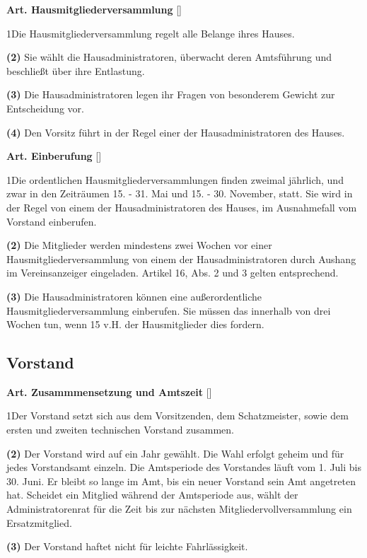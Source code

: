 \documentclass[12pt]{article}
\newcommand{\UAbschnitt}[1]{\subsection{#1}}
\newcommand{\Satz}[2]{

\begin{samepage}
{\bf (#1)} #2
\end{samepage}
}
\newenvironment{Artikel}[2]{
\bigskip \centerline{{\bf Art. #1} [#2]}
\nopagebreak
}{
}
\begin{document}
\begin{Artikel}{20}{Hausmitgliederversammlung}

\Satz{1}{Die Hausmitgliederversammlung regelt alle Belange ihres Hauses.}

\Satz{2}{Sie wählt die Hausadministratoren, überwacht deren Amtsführung und
beschließt über ihre Entlastung.}

\Satz{3}{Die Hausadministratoren legen ihr Fragen von besonderem Gewicht zur
Entscheidung vor.}

\Satz{4}{Den Vorsitz führt in der Regel einer der Hausadministratoren des
Hauses.}

\end{Artikel}

\begin{Artikel}{21}{Einberufung}

\Satz{1}{Die ordentlichen Hausmitgliederversammlungen finden zweimal jährlich,
und zwar in den Zeit\-räumen 15. - 31. Mai und 15. - 30. November, statt. Sie
wird in der Regel von einem der Hausadministratoren des Hauses, im Ausnahmefall
vom Vorstand einberufen.}

\Satz{2}{Die Mitglieder werden mindestens zwei Wochen vor einer
Hausmitgliederversammlung von einem der Hausadministratoren durch Aushang im
Vereinsanzeiger eingeladen. Artikel 16, Abs. 2 und 3 gelten entsprechend.}

\Satz{3}{Die Hausadministratoren können eine außerordentliche
Hausmitgliederversammlung einberufen. Sie müssen das innerhalb von drei Wochen
tun, wenn 15 v.H. der Hausmitglieder dies fordern.}

\end{Artikel}

\UAbschnitt{Vorstand}

\begin{Artikel}{22}{Zusammmensetzung und Amtszeit}

\Satz{1}{Der Vorstand setzt sich aus dem Vorsitzenden, dem Schatzmeister, sowie
dem ersten und zweiten technischen Vorstand zusammen.}

\Satz{2}{Der Vorstand wird auf ein Jahr gewählt. Die Wahl erfolgt geheim und
für jedes Vorstandsamt einzeln. Die Amtsperiode des Vorstandes
läuft vom 1. Juli bis 30. Juni. Er bleibt so lange im Amt, bis ein neuer
Vorstand sein Amt angetreten hat. Scheidet ein Mitglied während der Amtsperiode
aus, wählt der Administratorenrat für die Zeit bis zur nächsten
Mitgliedervollversammlung ein Ersatzmitglied.}

\Satz{3}{Der Vorstand haftet nicht für leichte Fahrlässigkeit.}

\end{Artikel}
\end{document}
